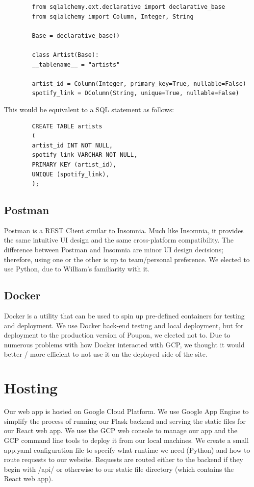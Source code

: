 \documentclass{scrartcl}
\begin{document}
    \begin{verbatim}
        from sqlalchemy.ext.declarative import declarative_base
        from sqlalchemy import Column, Integer, String

        Base = declarative_base()

        class Artist(Base):
        __tablename__ = "artists"

        artist_id = Column(Integer, primary_key=True, nullable=False)
        spotify_link = DColumn(String, unique=True, nullable=False)
    \end{verbatim}

    This would be equivalent to a SQL statement as follows:

    \begin{verbatim}
        CREATE TABLE artists
        (
        artist_id INT NOT NULL,
        spotify_link VARCHAR NOT NULL,
        PRIMARY KEY (artist_id),
        UNIQUE (spotify_link),
        );
    \end{verbatim}

    \subsection{Postman}
    Postman is a REST Client similar to Insomnia. Much like Insomnia, it provides the same intuitive UI design and the same cross-platform compatibility. The difference between Postman and Insomnia are minor UI design decisions; therefore, using one or the other is up to team/personal preference. We elected to use Python, due to William's familiarity with it.

    \subsection{Docker}
    Docker is a utility that can be used to spin up pre-defined containers for testing and deployment. We use Docker back-end testing and local deployment, but for deployment to the production version of Poupon, we elected not to. Due to numerous problems with how Docker interacted with GCP, we thought it would better / more efficient to not use it on the deployed side of the site.

    \section{Hosting}
    Our web app is hosted on Google Cloud Platform. We use Google App Engine to simplify the process of running our Flask backend and serving the static files for our React web app. We use the GCP web console to manage our app and the GCP command line tools to deploy it from our local machines. We create a small app.yaml configuration file to specify what runtime we need (Python) and how to route requests to our website. Requests are routed either to the backend if they begin with /api/ or otherwise to our static file directory (which contains the React web app).
\end{document}
